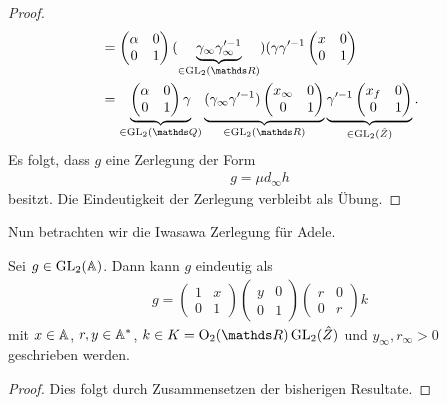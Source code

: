 \begin{proof}
\begin{align*}
&=\begin{pmatrix}
\alpha&0\\
0&1
\end{pmatrix} (\underbrace{\gamma_\infty \gamma_\infty'^{-1}}_{\in \GL_2(\R)} ) (\gamma \gamma'^{-1} \begin{pmatrix}
x&0\\
0&1
\end{pmatrix}\\
&=\underbrace{\begin{pmatrix}
\alpha&0\\
0&1
\end{pmatrix} \gamma}_{\in \GL_2(\Q)} \underbrace{(\gamma_\infty \gamma'^{-1}) \begin{pmatrix}
x_\infty&0\\
0&1
\end{pmatrix}} _{\in \GL_2(\R)}
\underbrace{\gamma'^{-1} \begin{pmatrix}
x_f&0\\
0&1
\end{pmatrix}}_{\in \GL_2(\hat{Z})}.
\end{align*}
Es folgt, dass $g$ eine Zerlegung der Form
\begin{align*}
g=\mu d_\infty h
\end{align*}
besitzt.
Die Eindeutigkeit der Zerlegung verbleibt als Übung.
\end{proof}

Nun betrachten wir die Iwasawa Zerlegung für Adele.
\begin{prop}
Sei $g\in \operatorname{GL}_2(\mathbb{A})$.
Dann kann $g$ eindeutig als
\begin{align*}
g=\begin{pmatrix}
1&x\\
0&1
\end{pmatrix}
\begin{pmatrix}
y&0\\
0&1
\end{pmatrix}
\begin{pmatrix}
r&0\\
0&r
\end{pmatrix}
k
\end{align*}
mit $x\in \mathbb{A}$, $r,y\in \mathbb{A}^\ast$, $k\in K=\Oo_2(\R)\GL_2(\hat{Z})$ und $y_\infty,r_\infty>0$  geschrieben werden.
\end{prop}
\begin{proof}
Dies folgt durch Zusammensetzen der bisherigen Resultate.
\end{proof}

